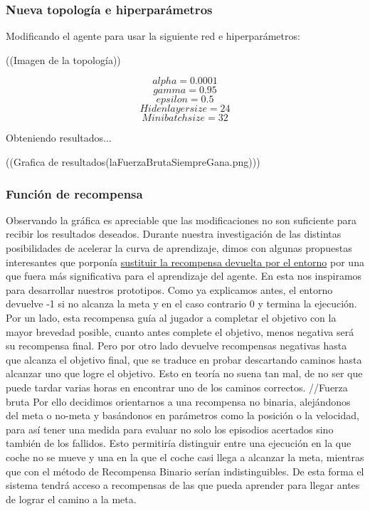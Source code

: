 \subsubsection*{Nueva topología e hiperparámetros}
Modificando el agente para usar la siguiente red e hiperparámetros:

((Imagen de la topología))

$$ alpha = 0.0001$$
$$ gamma = 0.95$$
$$ epsilon = 0.5$$
$$ Hiden layer size = 24$$
$$ Minibatch size = 32 $$

Obteniendo resultados... 

((Grafica de resultados(laFuerzaBrutaSiempreGana.png)))

\subsubsection*{Función de recompensa}
Observando la gráfica es apreciable que las modificaciones no son suficiente para recibir los resultados deseados.
Durante nuestra investigación de las distintas posibilidades de acelerar la curva de aprendizaje, dimos con algunas propuestas interesantes que porponía \href{ https://medium.com/@ts1829/solving-mountain-car-with-q-learning-b77bf71b1de2}{sustituir la recompensa devuelta por el entorno} por una que fuera más significativa para el aprendizaje del agente. En esta nos inspiramos para desarrollar nuestros prototipos.
Como ya explicamos antes, el entorno devuelve -1 si no alcanza la meta y en el caso contrario 0 y termina la ejecución. 
Por un lado, esta recompensa guía al jugador a completar el objetivo con la mayor brevedad posible, cuanto antes complete el objetivo, menos negativa será su recompensa final.
Pero por otro lado devuelve recompensas negativas hasta que alcanza el objetivo final, que se traduce en probar descartando caminos hasta alcanzar uno que logre el objetivo. Esto en teoría no suena tan mal, de no ser que puede tardar varias horas en encontrar uno de los caminos correctos. 
//Fuerza bruta 
Por ello decidimos orientarnos a una recompensa no binaria, alejándonos del meta o no-meta y basándonos en parámetros como la posición o la velocidad, para así tener una medida para evaluar no solo los episodios acertados sino también de los fallidos. Esto permitiría distinguir entre una ejecución en la que coche no se mueve y una en la que el coche casi llega a alcanzar la meta, mientras que con el método de Recompensa Binario serían indistinguibles. De esta forma el sistema tendrá acceso a recompensas de las que pueda aprender para llegar antes de lograr el camino a la meta. 

